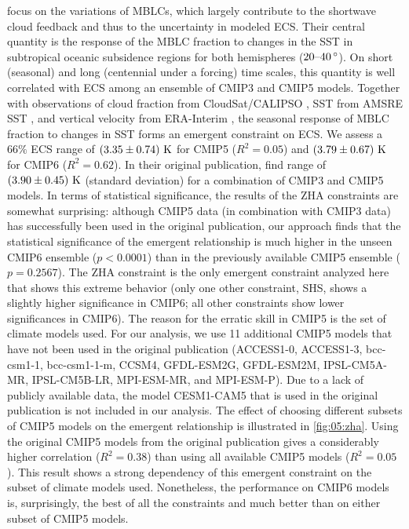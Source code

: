 \textcite{Zhai2015} focus on the variations of \acp{MBLC}, which largely
contribute to the shortwave cloud feedback and thus to the uncertainty in
modeled \ac{ECS}. Their central quantity is the response of the \ac{MBLC}
fraction to changes in the \ac{SST} in subtropical oceanic subsidence regions
for both hemispheres ($\rangeunit{20}{40}{\degree}$). On short (seasonal) and
long (centennial under a forcing) time scales, this quantity is well correlated
with \ac{ECS} among an ensemble of \acs{CMIP}3 and \acs{CMIP}5 models. Together
with observations of cloud fraction from CloudSat/CALIPSO \autocite{Mace2009},
\ac{SST} from AMSRE \ac{SST} \autocite{AMSRE2011}, and vertical velocity from
ERA-Interim \autocite{Dee2011}, the seasonal response of \ac{MBLC} fraction to
changes in \ac{SST} forms an emergent constraint on \ac{ECS}. We assess a $66
\unit{\%}$ \ac{ECS} range of $\pmrangeunit{3.35}{0.74}{K}$ for \acs{CMIP}5
($R^2 = 0.05$) and $\pmrangeunit{3.79}{0.67}{K}$ for \acs{CMIP}6 ($R^2 =
0.62$). In their original publication, \textcite{Zhai2015} find  range
of $\pmrangeunit{3.90}{0.45}{K}$ (standard deviation) for a combination of
\acs{CMIP}3 and \acs{CMIP}5 models. In terms of statistical significance, the
results of the ZHA constraints are somewhat surprising: although \acs{CMIP}5
data (in combination with \acs{CMIP}3 data) has successfully been used in the
original publication, our approach finds that the statistical significance of
the emergent relationship is much higher in the unseen \acs{CMIP}6 ensemble ($p
< 0.0001$) than in the previously available \acs{CMIP}5 ensemble ($p =
0.2567$). The ZHA constraint is the only emergent constraint analyzed here that
shows this extreme behavior (only one other constraint, SHS, shows a slightly
higher significance in \acs{CMIP}6; all other constraints show lower
significances in \acs{CMIP}6). The reason for the erratic skill in \acs{CMIP}5
is the set of climate models used. For our analysis, we use 11 additional
\acs{CMIP}5 models that have not been used in the original publication
(ACCESS1-0, ACCESS1-3, bcc-csm1-1, bcc-csm1-1-m, CCSM4, GFDL-ESM2G, GFDL-ESM2M,
IPSL-CM5A-MR, IPSL-CM5B-LR, MPI-ESM-MR, and MPI-ESM-P). Due to a lack of
publicly available data, the model \acs{CESM}1-CAM5 that is used in the
original publication is not included in our analysis. The effect of choosing
different subsets of \acs{CMIP}5 models on the emergent relationship is
illustrated in \cref{fig:05:zha}. Using the original \acs{CMIP}5 models from
the original publication gives a considerably higher correlation ($R^2 = 0.38$)
than using all available \acs{CMIP}5 models ($R^2 = 0.05$). This result shows a
strong dependency of this emergent constraint on the subset of climate models
used. Nonetheless, the performance on \acs{CMIP}6 models is, surprisingly, the
best of all the constraints and much better than on either subset of
\acs{CMIP}5 models.


